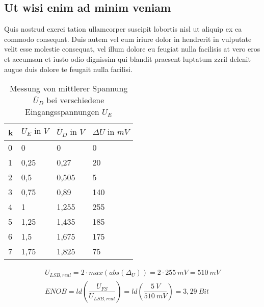 \documentclass[
    a4paper,             %
    12pt,                %
    headheight=34pt,     %
    parskip,             %
    bibliography=totoc,  %
    index=totoc,         %
    listof=totoc,        %
    ]{scrartcl}          %
\begin{document}
        \subsection{Ut wisi enim ad minim veniam}
            Quis nostrud exerci tation ullamcorper suscipit lobortis nisl ut aliquip ex ea commodo consequat. Duis autem vel eum iriure dolor in hendrerit in vulputate velit esse molestie consequat, vel illum dolore eu feugiat nulla facilisis at vero eros et accumsan et iusto odio dignissim qui blandit praesent luptatum zzril delenit augue duis dolore te feugait nulla facilisi.  
            \begin{table}[H]
                \centering
                \begin{adjustbox}{max width=\textwidth} %
                    \bgroup\def\arraystretch{1.5} %
                    \begin{tabular}{|l|l|l|l|}
                        \hline\rowcolor{lightgray}
                        k&{$ U_E\text{ in } V $} & {$ \overline{U}_D \text{ in } V$} & {$ \Delta U \text{ in } mV$}\\ \hline
                        0&0		     & 0		 & 0\\\hline 
                        1&0,25		 & 0,27		 & 20\\\hline 
                        2&0,5		 & 0,505		 & 5\\\hline 
                        3&0,75		 & 0,89		 & 140\\\hline 
                        4&1		     & 1,255		 & 255\\\hline 
                        5&1,25		 & 1,435		 & 185\\\hline 
                        6&1,5		 & 1,675		 & 175\\\hline 
                        7&1,75		 & 1,825		 & 75\\\hline 
                    \end{tabular}
                    \egroup
                \end{adjustbox}
                \caption{Messung von mittlerer Spannung $ \overline{U}_D $ bei verschiedene Eingangsspannungen $ U_E $ }  %
                \label{tab:24a} %
            \end{table}
            \begin{align}
                U_{LSB,real}=2\cdot max(abs(\Delta_U))=2\cdot 255~mV=510~mV  \\
                ENOB = ld(\dfrac{U_{FS}}{U_{LSB,real}})=ld(\dfrac{5~V}{510~mV})=3,29~Bit
            \end{align}
        
\end{document}
